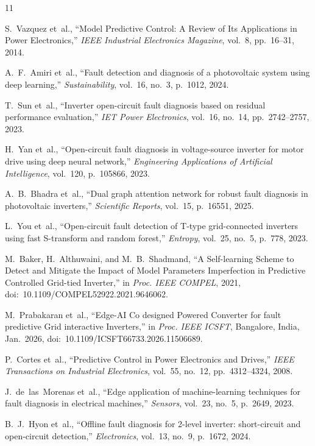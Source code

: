 \documentclass[conference]{IEEEtran}
\begin{document}
\begin{thebibliography}{11}

S.~Vazquez et~al., ``Model Predictive Control: A Review of Its Applications
in Power Electronics,'' \textit{IEEE Industrial Electronics Magazine},
vol.~8, pp.~16--31, 2014.

A.~F.~Amiri et~al., ``Fault detection and diagnosis of a photovoltaic system
using deep learning,'' \textit{Sustainability}, vol.~16, no.~3, p.~1012,
2024.

T.~Sun et~al., ``Inverter open-circuit fault diagnosis based on residual
performance evaluation,'' \textit{IET Power Electronics}, vol.~16, no.~14,
pp.~2742--2757, 2023.

H.~Yan et~al., ``Open-circuit fault diagnosis in voltage-source inverter for
motor drive using deep neural network,'' \textit{Engineering Applications of
Artificial Intelligence}, vol.~120, p.~105866, 2023.

A.~B.~Bhadra et~al., ``Dual graph attention network for robust fault
diagnosis in photovoltaic inverters,'' \textit{Scientific Reports}, vol.~15,
p.~16551, 2025.

L.~You et~al., ``Open-circuit fault detection of T-type grid-connected
inverters using fast S-transform and random forest,'' \textit{Entropy},
vol.~25, no.~5, p.~778, 2023.

M.~Baker, H.~Althuwaini, and M.~B.~Shadmand, ``A Self-learning Scheme to
Detect and Mitigate the Impact of Model Parameters Imperfection in Predictive
Controlled Grid-tied Inverter,'' in \textit{Proc. IEEE COMPEL}, 2021,
doi:~10.1109/COMPEL52922.2021.9646062.

M.~Prabakaran et~al., ``Edge-AI Co designed Powered Converter for fault
predictive Grid interactive Inverters,'' in \textit{Proc. IEEE ICSFT},
Bangalore, India, Jan.~2026,
doi:~10.1109/ICSFT66733.2026.11506689.

P.~Cortes et~al., ``Predictive Control in Power Electronics and Drives,''
\textit{IEEE Transactions on Industrial Electronics}, vol.~55, no.~12,
pp.~4312--4324, 2008.

J.~de~las~Morenas et~al., ``Edge application of machine-learning techniques
for fault diagnosis in electrical machines,'' \textit{Sensors}, vol.~23,
no.~5, p.~2649, 2023.

B.~J.~Hyon et~al., ``Offline fault diagnosis for 2-level inverter:
short-circuit and open-circuit detection,'' \textit{Electronics}, vol.~13,
no.~9, p.~1672, 2024.

\end{thebibliography}
\end{document}
